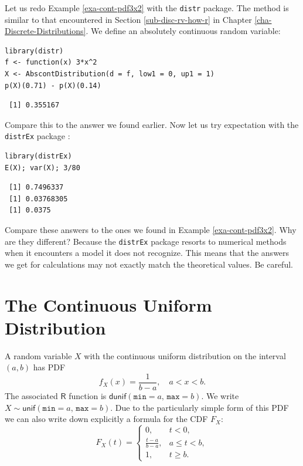 \documentclass[captions=tableheading]{scrbook}
\begin{document}
\begin{example}
Let us redo Example \ref{exa-cont-pdf3x2} with the \texttt{distr} package. The method is similar to that encountered in Section \ref{sub-disc-rv-how-r} in Chapter \ref{cha-Discrete-Distributions}. We define an absolutely continuous random variable:



\lstset{language=R}
\begin{lstlisting}
library(distr)
f <- function(x) 3*x^2
X <- AbscontDistribution(d = f, low1 = 0, up1 = 1)
p(X)(0.71) - p(X)(0.14)
\end{lstlisting}

\begin{verbatim}
 [1] 0.355167
\end{verbatim}

Compare this to the answer we found earlier. Now let us try expectation with the \texttt{distrEx} package \cite{Ruckdescheldistr}:

\lstset{language=R}
\begin{lstlisting}
library(distrEx)
E(X); var(X); 3/80
\end{lstlisting}

\begin{verbatim}
 [1] 0.7496337
 [1] 0.03768305
 [1] 0.0375
\end{verbatim}

Compare these answers to the ones we found in Example \ref{exa-cont-pdf3x2}. Why are they different? Because the \texttt{distrEx} package resorts to numerical methods when it encounters a model it does not recognize. This means that the answers we get for calculations may not exactly match the theoretical values. Be careful.
\end{example}
\section{The Continuous Uniform Distribution}
\label{sec-1-2}
\label{sec-The-Continuous-Uniform}


A random variable \(X\) with the continuous uniform distribution on the interval \((a,b)\) has PDF
\begin{equation}
f_{X}(x)=\frac{1}{b-a}, \quad a < x < b.
\end{equation}
The associated \(\mathsf{R}\) function is \(\mathsf{dunif}(\mathtt{min}=a,\,\mathtt{max}=b)\). We write \(X\sim\mathsf{unif}(\mathtt{min}=a,\,\mathtt{max}=b)\). Due to the particularly simple form of this PDF we can also write down explicitly a formula for the CDF \(F_{X}\):
\begin{equation}
F_{X}(t)=
\begin{cases}
0, & t < 0,\\
\frac{t-a}{b-a}, & a\leq t < b,\\
1, & t \geq b.
\end{cases}
\label{eq-unif-cdf}
\end{equation}
\end{document}
